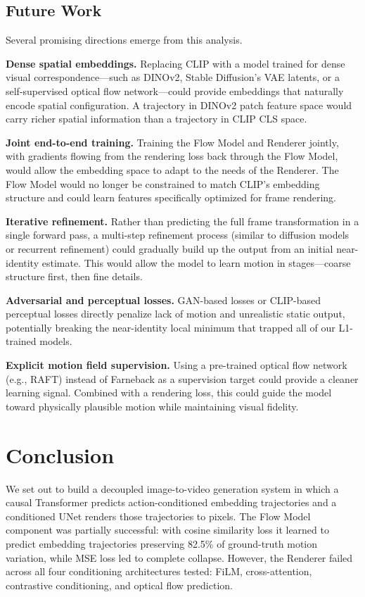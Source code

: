 \documentclass[10pt,twocolumn,letterpaper]{article}
\begin{document}
\subsection{Future Work}

Several promising directions emerge from this analysis.

\textbf{Dense spatial embeddings.} Replacing CLIP with a model trained for
dense visual correspondence---such as DINOv2, Stable Diffusion's VAE
latents, or a self-supervised optical flow network---could provide
embeddings that naturally encode spatial configuration. A trajectory in
DINOv2 patch feature space would carry richer spatial information than a
trajectory in CLIP CLS space.

\textbf{Joint end-to-end training.} Training the Flow Model and Renderer
jointly, with gradients flowing from the rendering loss back through the
Flow Model, would allow the embedding space to adapt to the needs of the
Renderer. The Flow Model would no longer be constrained to match CLIP's
embedding structure and could learn features specifically optimized for
frame rendering.

\textbf{Iterative refinement.} Rather than predicting the full frame
transformation in a single forward pass, a multi-step refinement process
(similar to diffusion models or recurrent refinement) could gradually build
up the output from an initial near-identity estimate. This would allow the
model to learn motion in stages---coarse structure first, then fine
details.

\textbf{Adversarial and perceptual losses.} GAN-based losses or CLIP-based
perceptual losses directly penalize lack of motion and unrealistic static
output, potentially breaking the near-identity local minimum that trapped
all of our L1-trained models.

\textbf{Explicit motion field supervision.} Using a pre-trained optical
flow network (e.g., RAFT) instead of Farneback as a supervision target
could provide a cleaner learning signal. Combined with a rendering loss,
this could guide the model toward physically plausible motion while
maintaining visual fidelity.

\section{Conclusion}

We set out to build a decoupled image-to-video generation system in which a
causal Transformer predicts action-conditioned embedding trajectories and a
conditioned UNet renders those trajectories to pixels. The Flow Model
component was partially successful: with cosine similarity loss it learned
to predict embedding trajectories preserving 82.5\% of ground-truth motion
variation, while MSE loss led to complete collapse. However, the Renderer
failed across all four conditioning architectures tested: FiLM,
cross-attention, contrastive conditioning, and optical flow prediction.
\end{document}
